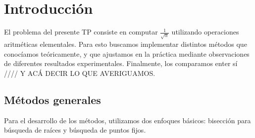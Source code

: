 \section{Introducción}
El problema del presente TP consiste en computar $\frac{1}{\sqrt{\alpha}}$ utilizando operaciones aritméticas elementales. Para esto buscamos implementar distintos métodos que conocíamos teóricamente, y que ajustamos en la práctica mediante observaciones de diferentes resultados experimentales. Finalmente, los comparamos enter sí //// Y ACÁ DECIR LO QUE AVERIGUAMOS.

\subsection{Métodos generales}
Para el desarrollo de los métodos, utilizamos dos enfoques básicos: bisección para búsqueda de raíces y búsqueda de puntos fijos.
